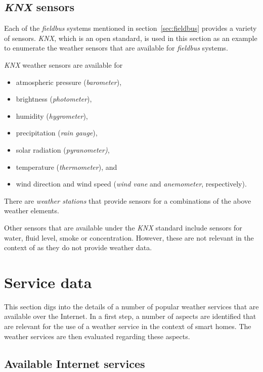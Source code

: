 \subsection{\emph{KNX} sensors}

Each of the \emph{fieldbus} systems mentioned in section~\ref{sec:fieldbus} provides a variety of sensors. \emph{KNX}, which is an open standard, is used in this section as an example to enumerate the weather sensors that are available for \emph{fieldbus} systems.

\emph{KNX} weather sensors are available for
\begin{itemize}
  \item atmospheric pressure (\emph{barometer}),
  \item brightness (\emph{photometer}),
  \item humidity (\emph{hygrometer}),
  \item precipitation (\emph{rain gauge}),
  \item solar radiation (\emph{pyranometer)},
  \item temperature (\emph{thermometer}), and
  \item wind direction and wind speed (\emph{wind vane} and \emph{anemometer}, respectively).
\end{itemize}

There are \emph{weather stations} that provide sensors for a combinations of the above weather elements.

Other sensors that are available under the \emph{KNX} standard include sensors for water, fluid level, smoke or  concentration. However, these are not relevant in the context of \smarthomeweather as they do not provide weather data.


\section{Service data}
\label{sec:weather_services}

This section digs into the details of a number of popular weather services that are available over the Internet. In a first step, a number of aspects are identified that are relevant for the use of a weather service in the context of smart homes. The weather services are then evaluated regarding these aspects.

\subsection{Available Internet services}
\label{sec:internet_services}

